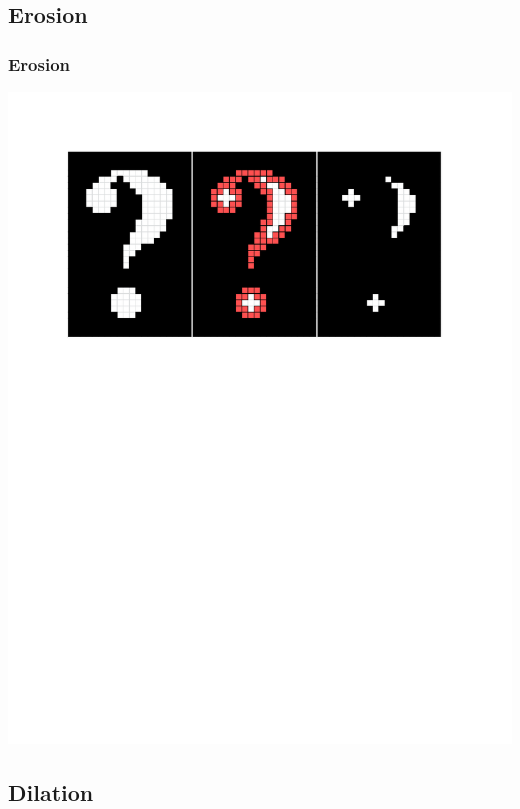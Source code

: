 \documentclass{beamer}
\begin{document}
\subsection[Erosion]{Erosion}

\begin{frame}
\frametitle{Erosion}
\includegraphics[width=1\textwidth]{erosion}
\end{frame}

\subsection[Dilation]{Dilation}
\end{document}
